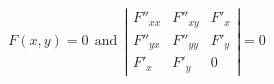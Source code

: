 \documentclass{minimal}
\begin{document}
$$F(x,y)=0 ~~\mbox{and}~~  \left| \begin{array}{ccc}    F''_{xx} & F''_{xy} &  F'_x \\    F''_{yx} & F''_{yy} &  F'_y \\    F'_x     & F'_y     & 0     \end{array}\right| = 0$$
\end{document}
